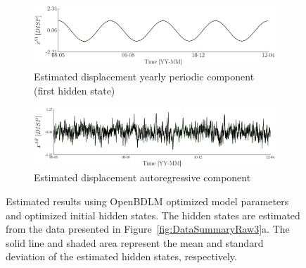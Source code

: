 \begin{figure}[h!]
\ContinuedFloat
\begin{subfigure}{\linewidth}
\includegraphics[width=0.9\linewidth]{./docfigs/Example_DISPSIM_ANOMALY/optim_param_optim_initialhiddenstate/DISP_S1_4.pdf}
\caption{Estimated displacement yearly periodic component (first hidden state)}
\end{subfigure}
\begin{subfigure}{\linewidth}
\includegraphics[width=0.9\linewidth]{./docfigs/Example_DISPSIM_ANOMALY/optim_param_optim_initialhiddenstate/DISP_AR_6.pdf} 
\caption{Estimated displacement autoregressive component}
\end{subfigure}
\caption{Estimated results using OpenBDLM optimized model parameters and optimized initial hidden states. The hidden states are estimated from the data presented in Figure~\ref{fig:DataSummaryRaw3}a. The solid line and shaded area represent the mean and standard deviation of the estimated hidden states, respectively.}
\label{fig:DISPSIMANOMALYOptimizedOptimizedExample3}
\end{figure}
